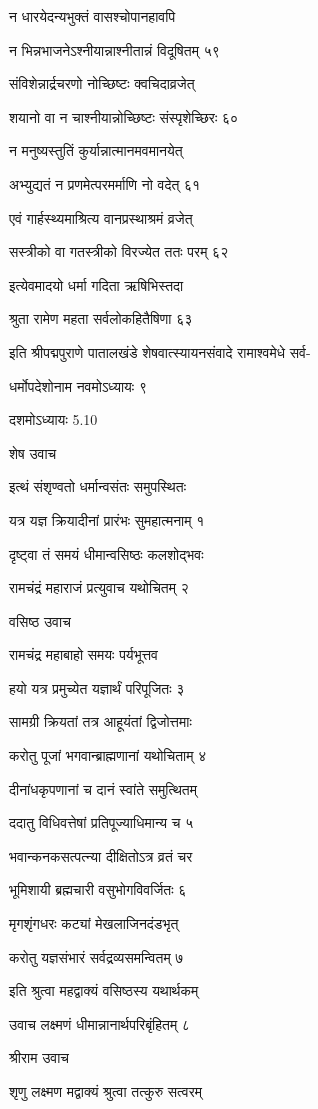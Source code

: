 न धारयेदन्यभुक्तं वासश्चोपानहावपि

न भिन्नभाजनेऽश्नीयान्नाश्नीतान्नं विदूषितम् ५९

संविशेन्नार्द्रचरणो नोच्छिष्टः क्वचिदाव्रजेत्

शयानो वा न चाश्नीयान्नोच्छिष्टः संस्पृशेच्छिरः ६०

न मनुष्यस्तुतिं कुर्यान्नात्मानमवमानयेत्

अभ्युद्यतं न प्रणमेत्परमर्माणि नो वदेत् ६१

एवं गार्हस्थ्यमाश्रित्य वानप्रस्थाश्रमं व्रजेत्

सस्त्रीको वा गतस्त्रीको विरज्येत ततः परम् ६२

इत्येवमादयो धर्मा गदिता ऋषिभिस्तदा

श्रुता रामेण महता सर्वलोकहितैषिणा ६३

इति श्रीपद्मपुराणे पातालखंडे शेषवात्स्यायनसंवादे रामाश्वमेधे सर्व-

धर्मोपदेशोनाम नवमोऽध्यायः ९

दशमोऽध्यायः 5.10

शेष उवाच

इत्थं संशृण्वतो धर्मान्वसंतः समुपस्थितः

यत्र यज्ञ क्रियादीनां प्रारंभः सुमहात्मनाम् १

दृष्ट्वा तं समयं धीमान्वसिष्ठः कलशोद्भवः

रामचंद्रं महाराजं प्रत्युवाच यथोचितम् २

वसिष्ठ उवाच

रामचंद्र महाबाहो समयः पर्यभूत्तव

हयो यत्र प्रमुच्येत यज्ञार्थं परिपूजितः ३

सामग्री क्रियतां तत्र आहूयंतां द्विजोत्तमाः

करोतु पूजां भगवान्ब्राह्मणानां यथोचिताम् ४

दीनांधकृपणानां च दानं स्वांते समुत्थितम्

ददातु विधिवत्तेषां प्रतिपूज्याधिमान्य च ५

भवान्कनकसत्पत्न्या दीक्षितोऽत्र व्रतं चर

भूमिशायी ब्रह्मचारी वसुभोगविवर्जितः ६

मृगशृंगधरः कट्यां मेखलाजिनदंडभृत्

करोतु यज्ञसंभारं सर्वद्रव्यसमन्वितम् ७

इति श्रुत्वा महद्वाक्यं वसिष्ठस्य यथार्थकम्

उवाच लक्ष्मणं धीमान्नानार्थपरिबृंहितम् ८

श्रीराम उवाच

शृणु लक्ष्मण मद्वाक्यं श्रुत्वा तत्कुरु सत्वरम्


